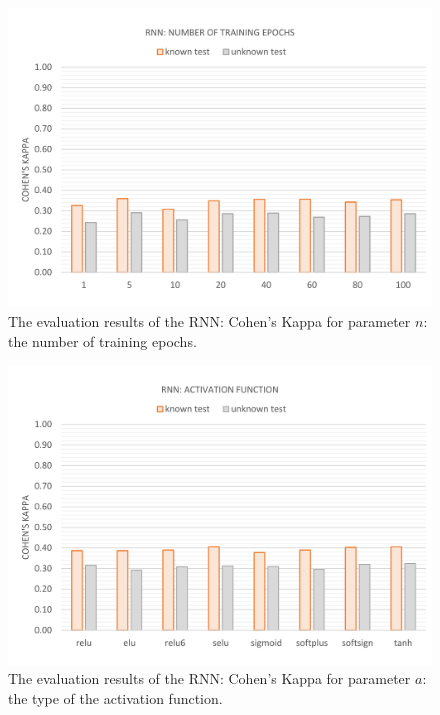\vspace{-11mm}
\begin{figure}[H]
	\centering\includegraphics[width=\textwidth]{images/evaluation_rnn_n_k}
	\caption[RNN Evaluation: Number of Training Epochs]{The evaluation results of the RNN: Cohen's Kappa for parameter $n$: the number of training epochs.}
	\label{f.evaluation.rnn.n.k}
\end{figure}

\vspace{-11mm}
\begin{figure}[H]
	\centering\includegraphics[width=\textwidth]{images/evaluation_rnn_a_k}
	\caption[RNN Evaluation: Activation Function]{The evaluation results of the RNN: Cohen's Kappa for parameter $a$: the type of the activation function.}
	\label{f.evaluation.rnn.a.k}
\end{figure}


